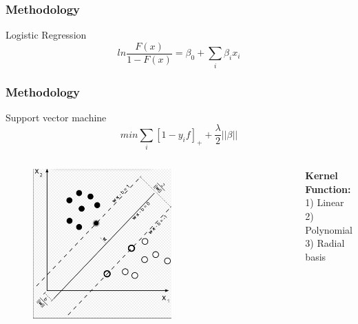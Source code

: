 \documentclass{beamer}
\begin{document}
\begin{frame}
\frametitle{Methodology}
\begin{block}{Logistic Regression}
\begin{equation}
ln{\frac{F(x)}{1-F(x)}}=\beta_0+\sum_i\beta_ix_i
\end{equation}
\end{block}

\frametitle{Methodology}
\begin{block}{Support vector machine}
\begin{equation}
min{\sum_{i}[1-y_if]_{+}}+\frac{\lambda}{2}||\beta||
\end{equation}
\end{block}

\begin{columns}
\column{2.3in}
	 \begin{figure}
     \includegraphics[width=0.6\textwidth, height=0.35\textheight]{svm.png}

    \end{figure}

\column{2.3in}
\textbf{Kernel Function:}\\
1) Linear\\
2) Polynomial\\
3) Radial basis\\
\end{columns}

\end{frame}
\end{document}
